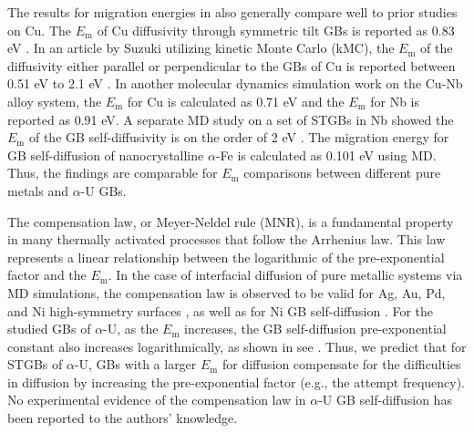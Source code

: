 \documentclass[review]{elsarticle}
\begin{document}
The results for migration energies in  also generally compare well to prior studies on Cu. The $E_{\mathrm{m}}$ of Cu diffusivity through symmetric tilt GBs is reported as 0.83 eV \cite{AginCu}.
In an article by Suzuki \cite{Suzuki2003} utilizing kinetic Monte Carlo (kMC), the $E_{\mathrm{m}}$ of the diffusivity either parallel or perpendicular to the GBs of Cu is reported between 0.51 eV to 2.1 eV \cite{Suzuki2003}. In another molecular dynamics simulation work on the Cu-Nb alloy system, the $E_{\mathrm{m}}$ for Cu is calculated as 0.71 eV and the $E_{\mathrm{m}}$ for Nb is reported as 0.91 eV\cite{cu_nb}. A separate MD study on a set of STGBs in Nb showed the $E_{\mathrm{m}}$ of the GB self-diffusivity is on the order of 2 eV \cite{Popov2022}. The migration energy for GB self-diffusion of nanocrystalline $\alpha$-Fe \cite{MOHAMMADZADEH201756} is calculated as 0.101 eV using MD. Thus, the findings are comparable for $E_{\mathrm{m}}$ comparisons between different pure metals and $\alpha$-U GBs.

The compensation law, or Meyer-Neldel rule (MNR), is a fundamental property in many thermally activated processes that follow the Arrhenius law. This law represents a linear relationship between the logarithmic of the pre-exponential factor and the $E_{\mathrm{m}}$. In the case of interfacial diffusion of pure metallic systems via MD simulations, the compensation law is observed to be valid for Ag, Au, Pd, and Ni high-symmetry surfaces \cite{compansation}, as well as for Ni GB self-diffusion \cite{Mendelev2005}. For the studied GBs of $\alpha$-U, as the $E_{\mathrm{m}}$ increases, the GB self-diffusion pre-exponential constant also increases logarithmically, as shown in see . Thus, we predict that for STGBs of $\alpha$-U, GBs with a larger $E_{\mathrm{m}}$ for diffusion compensate for the difficulties in diffusion by increasing the pre-exponential factor (e.g., the attempt frequency). No experimental evidence of the compensation law in $\alpha$-U GB self-diffusion has been reported to the authors' knowledge.
\end{document}
